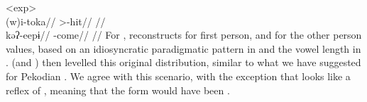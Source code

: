 \pex<exp>
 \akuriyo \parencite[][86]{gildea1994akuriyo}\\
\begingl
\gla (w)i-toka//
\glb {}>-hit//
\glft {}//
\endgl
{} \akuriyo \parencite[][114]{meira1998proto}\\
\begingl
\gla kəʔ-eepɨ//
\glb {}-come//
\glft {}//
\endgl
\xe
%
%
%
%
For , \textcite[114--115]{meira1998proto} reconstructs \PTar {} for first person, and  for the other person values, based on an idiosyncratic paradigmatic pattern in \trio and the vowel length in \akuriyo.
\akuriyo (and \carijo) then levelled this original distribution, similar to what we have suggested for Pekodian .
We agree with this scenario, with the exception that \trio {} looks like a reflex of  , meaning that the \PTir form would have been .

%

